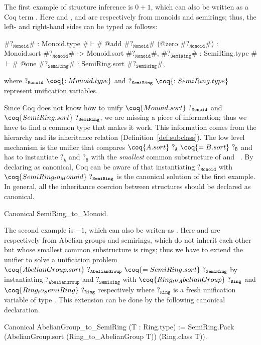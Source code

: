 \documentclass[a4paper,UKenglish,cleveref, autoref]{lipics-v2019}
\theoremstyle{implem}
\theoremstyle{implem}
\theoremstyle{command}
\begin{document}
The first example of structure inference is \(0 + 1\), which can also be written as a Coq term .
Here  and , and  are respectively from monoids and semirings; thus, the left- and right-hand sides can be typed as follows:
\begin{coqcode}
#$?_{\texttt{Monoid}}$# : Monoid.type #$\vdash$# @add #$?_{\texttt{Monoid}}$# (@zero #$?_{\texttt{Monoid}}$#) : Monoid.sort #$?_{\texttt{Monoid}}$# -> Monoid.sort #$?_{\texttt{Monoid}}$#,
#$?_{\texttt{SemiRing}}$# : SemiRing.type #$\vdash$# @one #$?_{\texttt{SemiRing}}$# : SemiRing.sort #$?_{\texttt{SemiRing}}$#,
\end{coqcode}
where \(?_{\texttt{Monoid}}~\coq{: Monoid.type}\) and \(?_{\texttt{SemiRing}}~\coq{: SemiRing.type}\) represent unification variables.

Since Coq does not know how to unify \(\coq{Monoid.sort}~?_{\texttt{Monoid}}\) and \(\coq{SemiRing.sort}~?_{\texttt{SemiRing}}\), we are missing a piece of information; thus we have to find a common type that makes it work.
This information comes from the hierarchy and its inheritance relation (Definition~\ref{def:subclass}).
The low level mechanism is the unifier that compares \(\coq{A.sort}~?_{\texttt{A}}~\coq{= B.sort}~?_{\texttt{B}}\) and has to instantiate \(?_{\texttt{A}}\) and \(?_{\texttt{B}}\) with the \emph{smallest} common substructure of  and ~\cite[Sect.~4]{KSdraft}.
By declaring  as canonical, Coq can be aware of that instantiating \(?_{\texttt{Monoid}}\) with \(\coq{SemiRing_to_Monoid}~?_{\texttt{SemiRing}}\) is the canonical solution of the first example.
In general, all the inheritance coercion between structures should be declared as canonical.
\begin{coqcode}
Canonical SemiRing_to_Monoid.
\end{coqcode}

The second example is \(- 1\), which can also be writen as .
Here  and  are respectively from Abelian groups and semirings, which do not inherit each other but whose smallest common substructure is rings; thus we have to extend the unifier to solve a unification problem \(\coq{AbelianGroup.sort}~?_{\texttt{AbelianGroup}}~\coq{= SemiRing.sort}~?_{\texttt{SemiRing}}\) by instantiating \(?_{\texttt{AbelianGroup}}\) and \(?_{\texttt{SemiRing}}\) with \(\coq{Ring_to_AbelianGroup}~?_{\texttt{Ring}}\) and \(\coq{Ring_to_SemiRing}~?_{\texttt{Ring}}\) respectively where \(?_{\texttt{Ring}}\) is a fresh unification variable of type .
This extension can be done by the following canonical declaration.
\begin{coqcode}
Canonical AbelianGroup_to_SemiRing (T : Ring.type) :=
  SemiRing.Pack (AbelianGroup.sort (Ring_to_AbelianGroup T)) (Ring.class T)).
\end{coqcode}
\end{document}
